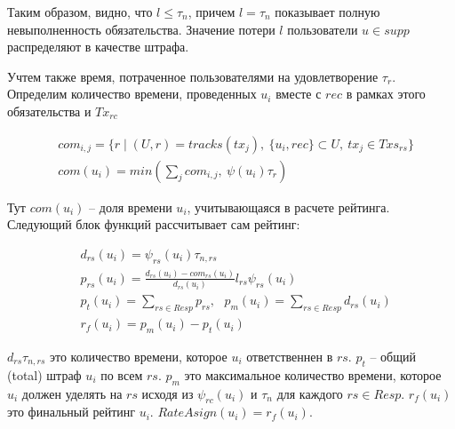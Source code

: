 \documentclass[specification,annotation]{itmo-student-thesis}
\begin{document}
Таким образом, видно, что $l \leq \tau_n$, причем $l = \tau_n$
показывает полную невыполненность обязательства. Значение потери $l$
пользователи $u \in supp$ распределяют в качестве штрафа.

Учтем также время, потраченное пользователями на удовлетворение
$\tau_r$. Определим количество времени, проведенных $u_i$ вместе с
$rec$ в рамках этого обязательства и $Tx_{rc}$

\begin{align*}
  &com_{i,j} = \{r \mid (U,r) = tracks(tx_j),\ \{u_i, rec\} \subset U, \ tx_j \in Txs_{rs}\} \\
  &com(u_i) = min{(\sum_j{com_{i,j}}, \ \psi(u_i) \tau_r)}
\end{align*}

Тут $com(u_i)$ -- доля времени $u_i$, учитывающаяся в расчете рейтинга. Следующий блок функций рассчитывает сам рейтинг:

\begin{align*}
  &d_{rs}(u_i) = \psi_{rs}(u_i)\tau_{n,rs} \\
  &p_{rs}(u_i) = \frac{d_{rs}(u_i) - com_{rs}(u_i)}{d_{rs}(u_i)} l_{rs} \psi_{rs}(u_i) \\
  &p_t(u_i) = \sum_{rs \in Resp}{p_{rs}}, \ \ \ p_m(u_i) = \sum_{rs \in Resp}{d_{rs}(u_i)} \\
  &r_f(u_i) = p_m(u_i) - p_t(u_i)
\end{align*}

$d_{rs}\tau_{n,rs}$ это количество времени, которое $u_i$
ответственнен в $rs$. $p_t$ -- общий (total) штраф $u_i$ по всем
$rs$. $p_m$ это максимальное количество времени, которое $u_i$ должен
уделять на $rs$ исходя из $\psi_{rc}(u_i)$ и $\tau_n$ для каждого $rs
\in Resp$. $r_f(u_i)$ это финальный рейтинг $u_i$. $RateAsign(u_i) =
r_f(u_i)$.
\end{document}
